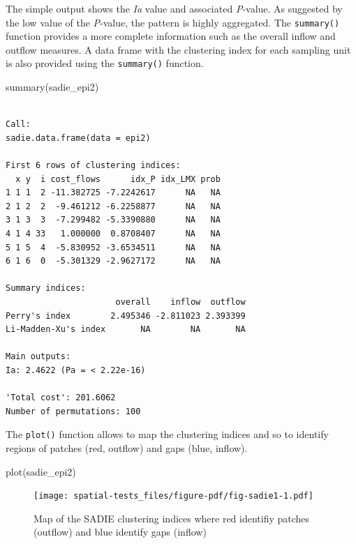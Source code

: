 \documentclass[
  letterpaper,
]{book}
\newenvironment{Shaded}{\begin{snugshade}}{\end{snugshade}}
\newcommand{\FunctionTok}[1]{\textcolor[rgb]{0.28,0.35,0.67}{#1}}
\newcommand{\NormalTok}[1]{\textcolor[rgb]{0.00,0.23,0.31}{#1}}
\begin{document}
The simple output shows the \emph{Ia} value and associated
\emph{P}-value. As suggested by the low value of the \emph{P}-value, the
pattern is highly aggregated. The \texttt{summary()} function provides a
more complete information such as the overall inflow and outflow
measures. A data frame with the clustering index for each sampling unit
is also provided using the \texttt{summary()} function.

\begin{Shaded}
\begin{Highlighting}[]
\FunctionTok{summary}\NormalTok{(sadie\_epi2)}
\end{Highlighting}
\end{Shaded}

\begin{verbatim}

Call:
sadie.data.frame(data = epi2)

First 6 rows of clustering indices:
  x y  i cost_flows      idx_P idx_LMX prob
1 1 1  2 -11.382725 -7.2242617      NA   NA
2 1 2  2  -9.461212 -6.2258877      NA   NA
3 1 3  3  -7.299482 -5.3390880      NA   NA
4 1 4 33   1.000000  0.8708407      NA   NA
5 1 5  4  -5.830952 -3.6534511      NA   NA
6 1 6  0  -5.301329 -2.9627172      NA   NA

Summary indices:
                      overall    inflow  outflow
Perry's index        2.495346 -2.811023 2.393399
Li-Madden-Xu's index       NA        NA       NA

Main outputs:
Ia: 2.4622 (Pa = < 2.22e-16)

'Total cost': 201.6062
Number of permutations: 100
\end{verbatim}

The \texttt{plot()} function allows to map the clustering indices and so
to identify regions of patches (red, outflow) and gaps (blue, inflow).

\begin{Shaded}
\begin{Highlighting}[]
\FunctionTok{plot}\NormalTok{(sadie\_epi2) }
\end{Highlighting}
\end{Shaded}

\begin{figure}[H]

\texttt{[image: spatial-tests\_files/figure-pdf/fig-sadie1-1.pdf]} \hfill{}

\caption{\label{fig-sadie1}Map of the SADIE clustering indices where red
identifiy patches (outflow) and blue identify gaps (inflow)}

\end{figure}
\end{document}
